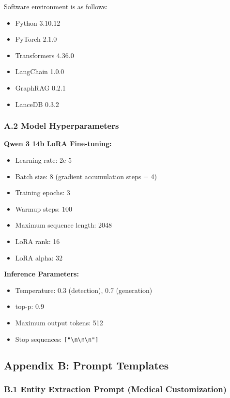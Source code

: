 \documentclass[11pt]{article}
\providecommand{\tightlist}{\setlength{\itemsep}{0pt}\setlength{\parskip}{0pt}}
\begin{document}
Software environment is as follows:

\begin{itemize}
\tightlist
\item
  Python 3.10.12
\item
  PyTorch 2.1.0
\item
  Transformers 4.36.0
\item
  LangChain 1.0.0
\item
  GraphRAG 0.2.1
\item
  LanceDB 0.3.2
\end{itemize}

\subsubsection{A.2 Model Hyperparameters}

\textbf{Qwen 3 14b LoRA Fine-tuning:}

\begin{itemize}
\tightlist
\item
  Learning rate: 2e-5
\item
  Batch size: 8 (gradient accumulation steps = 4)
\item
  Training epochs: 3
\item
  Warmup steps: 100
\item
  Maximum sequence length: 2048
\item
  LoRA rank: 16
\item
  LoRA alpha: 32
\end{itemize}

\textbf{Inference Parameters:}

\begin{itemize}
\tightlist
\item
  Temperature: 0.3 (detection), 0.7 (generation)
\item
  top-p: 0.9
\item
  Maximum output tokens: 512
\item
  Stop sequences: \texttt{{[}"\textbackslash{}n\textbackslash{}n\textbackslash{}n"{]}}
\end{itemize}

\subsection{Appendix B: Prompt Templates}

\subsubsection{B.1 Entity Extraction Prompt (Medical Customization)}
\end{document}
